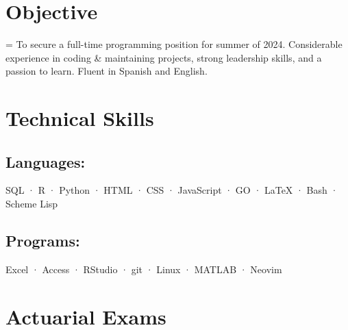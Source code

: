 \documentclass[12pt]{article}
\newcommand{\itemspace}{\vspace{0.1870em}}
\renewcommand{\textsc}[1]{\uppercase{\footnotesize#1}\normalsize}
\begin{document}
\maketitle

\vspace{-2.8mm}
\noindent\hrulefill

\vspace{-4.5mm}
\noindent\hrulefill

\itemspace
\section{Objective}

\hangindent=\parindent %
To secure a full-time programming position for summer of 2024.
Considerable experience in coding \& maintaining projects,
strong leadership skills, and a passion to learn. Fluent in Spanish and English.

\itemspace

\section{Technical Skills}

\subsection{Languages:} \:
\textsc{sql} · \textsc{r} · Python · \textsc{html} · \textsc{css} ·
JavaScript · \textsc{go} · \LaTeX{} · Bash · Scheme Lisp

\subsection{Programs:} \:
Excel · Access · RStudio · git ·  Linux · \textsc{MATLAB} · Neovim

\itemspace

\section{Actuarial Exams}
\end{document}
